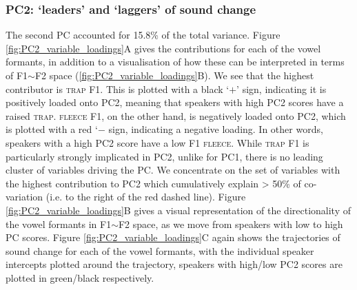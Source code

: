 \documentclass[review]{elsarticle} %
\begin{document}
\subsubsection{PC2: `leaders' and `laggers' of sound change}
\label{sec:PC2}




The second PC accounted for 15.8\% of the total variance. Figure \ref{fig:PC2_variable_loadings}A gives the contributions for each of the vowel formants, in addition to a visualisation of how these can be interpreted in terms of F1$\sim$F2 space (\ref{fig:PC2_variable_loadings}B). We see that the highest contributor is \textsc{trap} F1.  This is plotted with a black `$+$' sign, indicating it is positively loaded onto PC2, meaning that speakers with high PC2 scores have a raised \textsc{trap}. \textsc{fleece} F1, on the other hand, is negatively loaded onto PC2, which is plotted with a red `$-$ sign, indicating a negative loading.  In other words, speakers with a high PC2 score have a low F1 \textsc{fleece}. While \textsc{trap} F1 is particularly strongly implicated in PC2, unlike for PC1, there is no leading cluster of variables driving the PC.  We concentrate on the set of variables with the highest contribution to PC2 which cumulatively explain > 50\% of co-variation (i.e. to the right of the red dashed line). Figure \ref{fig:PC2_variable_loadings}B gives a visual representation of the directionality of the vowel formants in F1$\sim$F2 space, as we move from speakers with low to high PC scores. Figure \ref{fig:PC2_variable_loadings}C again shows the trajectories of sound change for each of the vowel formants, with the individual speaker intercepts plotted around the trajectory, speakers with high/low PC2 scores are plotted in green/black respectively.
\end{document}
